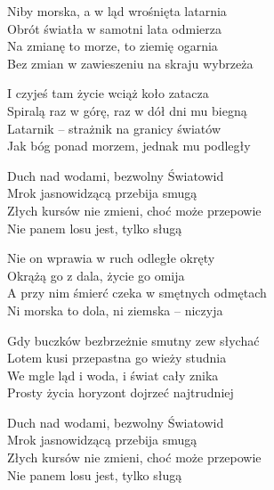\begin{text}
    Niby morska, a w ląd wrośnięta latarnia\\
    Obrót światła w samotni lata odmierza\\
    Na zmianę to morze, to ziemię ogarnia\\
    Bez zmian w zawieszeniu na skraju wybrzeża

    I czyjeś tam życie wciąż koło zatacza\\
    Spiralą raz w górę, raz w dół dni mu biegną\\
    Latarnik -- strażnik na granicy światów\\
    Jak bóg ponad morzem, jednak mu podległy

    Duch nad wodami, bezwolny Światowid\\
    Mrok jasnowidzącą przebija smugą\\
    Złych kursów nie zmieni, choć może przepowie\\
    Nie panem losu jest, tylko sługą

    Nie on wprawia w ruch odległe okręty\\
    Okrążą go z dala, życie go omija\\
    A przy nim śmierć czeka w smętnych odmętach\\
    Ni morska to dola, ni ziemska -- niczyja

    Gdy buczków bezbrzeżnie smutny zew słychać\\
    Lotem kusi przepastna go wieży studnia\\
    We mgle ląd i woda, i świat cały znika\\
    Prosty życia horyzont dojrzeć najtrudniej

    Duch nad wodami, bezwolny Światowid\\
    Mrok jasnowidzącą przebija smugą\\
    Złych kursów nie zmieni, choć może przepowie\\
    Nie panem losu jest, tylko sługą
\end{text}
\begin{chord}
\end{chord}